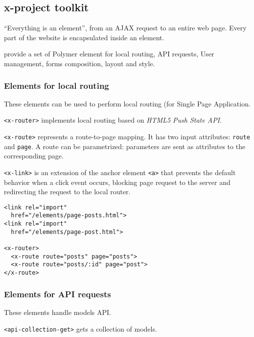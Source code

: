 \subsection{x-project toolkit}

``Everything is an element'', from an AJAX request to an entire web page. Every part of the website is encapsulated inside an element. 

 provide a set of Polymer element for local routing, API requests, User management, forms composition, layout and style. 

\subsubsection{Elements for local routing}
These elements can be used to perform local routing (for Single Page Application.

\vspace{0.2cm}

\texttt{<x-router>} implements local routing based on \emph{HTML5 Push State API}. 

\vspace{0.2cm}

\texttt{<x-route>} represents a route-to-page mapping. It has two input attributes: \texttt{route} and \texttt{page}. A route can be parametrized: parameters are sent as attributes to the corresponding page.

\vspace{0.2cm}

\texttt{<x-link>} is an extension of the anchor element \texttt{<a>} that prevents the default behavior when a click event occurs, blocking page request to the server and redirecting the request to the local router. 

\begin{lstlisting}[language=HTML5]
<link rel="import" 
  href="/elements/page-posts.html">
<link rel="import" 
  href="/elements/page-post.html">

<x-router>
  <x-route route="posts" page="posts">
  <x-route route="posts/:id" page="post">
</x-route>
\end{lstlisting}


\subsubsection{Elements for API requests}
These elements handle models API.

\texttt{<api-collection-get>} gets a collection of models. 

